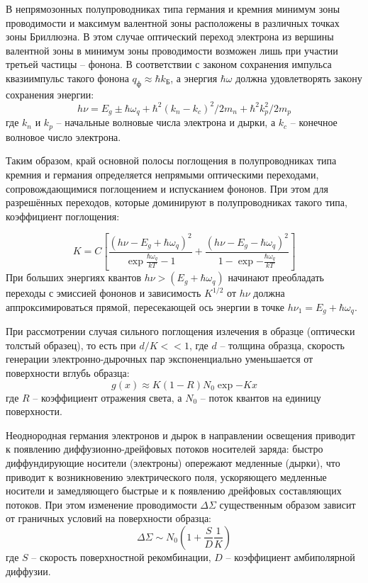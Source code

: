 \documentclass[a4paper, 12pt]{article}
\begin{document}
    В непрямозонных полупроводниках типа германия и кремния минимум зоны проводимости и максимум валентной зоны расположены в различных точках зоны Бриллюэна. В этом случае оптический переход электрона из вершины валентной зоны в минимум зоны проводимости возможен лишь при участии третьей частицы – фонона. В соответствии с законом сохранения импульса квазиимпульс такого фонона $q_{\text{ф}}\approx\hbar k_{\text{Б}}$, а энергия $\hbar\omega$ должна удовлетворять закону сохранения энергии:
    \begin{equation}
        h\nu = E_g\pm \hbar\omega_q+\hbar^2(k_n-k_c)^2/2m_n+\hbar^2k_p^2/2m_p
    \end{equation}
    где $k_n$ и $k_p$ -- начальные волновые числа электрона и дырки, а $k_c$ -- конечное волновое число электрона.

    Таким образом, край основной полосы поглощения в полупроводниках типа кремния и германия определяется непрямыми оптическими переходами, сопровождающимися поглощением и испусканием фононов. При этом для разрешённых переходов, которые доминируют в полупроводниках такого типа, коэффициент поглощения:

    \begin{equation}
        K=C\left[\frac{(h\nu-E_g+\hbar\omega_q)^2}{\exp{\frac{\hbar\omega_q}{kT}}-1}+\frac{(h\nu-E_g-\hbar\omega_q)^2}{1-\exp{-\frac{\hbar\omega_q}{kT}}}\right]
    \end{equation}
    При больших энергиях квантов $h\nu>(E_g+\hbar\omega_q)$ начинают преобладать переходы с эмиссией фононов и зависимость $K^{1/2}$ от $h\nu$ должна аппроксимироваться прямой, пересекающей ось энергии в точке $h\nu_1=E_g+\hbar\omega_q$.

    При рассмотрении случая сильного поглощения излечения в образце (оптически толстый образец), то есть при $d/K<<1$, где $d$ -- толщина образца, скорость генерации электронно-дырочных пар экспоненциально уменьшается от поверхности вглубь образца:
    \begin{equation}
        g(x)\approx K(1-R)N_0\exp{-Kx}
    \end{equation}
    где $R$ -- коэффициент отражения света, а $N_0$ -- поток квантов на единицу поверхности.

    Неоднородная германия электронов и дырок в направлении освещения приводит к появлению диффузионно-дрейфовых потоков носителей заряда: быстро диффундирующие носители (электроны) опережают медленные (дырки), что приводит к возникновению электрического поля, ускоряющего медленные носители и замедляющего быстрые и к появлению дрейфовых составляющих потоков. При этом изменение проводимости $\Delta\Sigma$ существенным образом зависит от граничных условий на поверхности образца:
    \begin{equation}
        \Delta\Sigma\sim N_0\left(1+\frac{S}{D}\frac{1}{K}\right)
    \end{equation}
    где $S$ -- скорость поверхностной рекомбинации, $D$ -- коэффициент амбиполярной диффузии.
    
\end{document}
